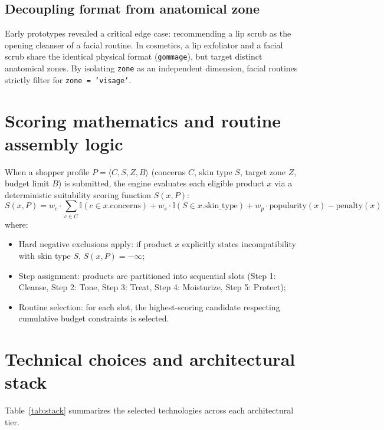 
\subsection{Decoupling format from anatomical zone}

Early prototypes revealed a critical edge case: recommending a lip scrub as the opening cleanser of a facial routine. In cosmetics, a lip exfoliator and a facial scrub share the identical physical format (\texttt{gommage}), but target distinct anatomical zones. By isolating \texttt{zone} as an independent dimension, facial routines strictly filter for \texttt{zone = 'visage'}.

\section{Scoring mathematics and routine assembly logic}

When a shopper profile $P = \langle C, S, Z, B \rangle$ (concerns $C$, skin type $S$, target zone $Z$, budget limit $B$) is submitted, the engine evaluates each eligible product $x$ via a deterministic suitability scoring function $S(x, P)$:
\begin{equation}
  S(x, P) = w_c \cdot \sum_{c \in C} \mathbb{I}(c \in x.\text{concerns}) + w_s \cdot \mathbb{I}(S \in x.\text{skin\_type}) + w_p \cdot \text{popularity}(x) - \text{penalty}(x)
\end{equation}
where:
\begin{itemize}
  \item Hard negative exclusions apply: if product $x$ explicitly states incompatibility with skin type $S$, $S(x, P) = -\infty$;
  \item Step assignment: products are partitioned into sequential slots (Step 1: Cleanse, Step 2: Tone, Step 3: Treat, Step 4: Moisturize, Step 5: Protect);
  \item Routine selection: for each slot, the highest-scoring candidate respecting cumulative budget constraints is selected.
\end{itemize}

\section{Technical choices and architectural stack}

Table~\ref{tab:stack} summarizes the selected technologies across each architectural tier.

